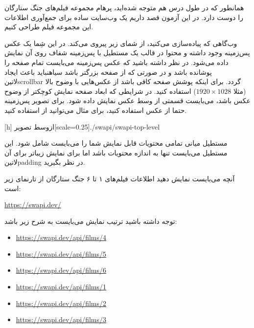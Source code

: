 
همانطور که در طول درس هم متوجه شده‌اید، پرهام مجموعه فیلم‌های جنگ ستارگان را دوست دارد.
در این آزمون قصد داریم یک وب‌سایت ساده برای جمع‌آوری اطلاعات این مجموعه فیلم طراحی کنیم.

وب‌گاهی که پیاده‌سازی می‌کنید، از شمای زیر پیروی می‌کند. در این شِما یک عکس پس‌زمینه وجود داشته و محتوا در قالب یک مستطیل با پس‌زمینه شفاف روی آن نمایش داده می‌شود.
در نظر داشته باشید که عکس پس‌زمینه می‌بایست تمام صفحه را پوشانده باشد و در صورتی که از صفحه بزرگتر باشد ‌سیاه{نباید} باعث ایجاد ‌لاتین{scrollbar} گردد.
برای اینکه پوشش صفحه کافی باشد از عکس‌هایی با وضوح بالا (مثلا $1920 \times 1028$) استفاده کنید.
در شرایطی که ابعاد صفحه نمایش کوچکتر از وضوح عکس باشد، می‌بایست قسمتی از وسط عکس نمایش داده شود.
برای تصویر پس‌زمینه حتما از عکس استفاده کنید، برای مثال می‌توانید از  استفاده کنید.

[h]
  ‌ازوسط
  ‌تصویر[scale=0.25]{./swapi/swapi-top-level}

مستطیل میانی تمامی محتویات قابل نمایش شما را می‌بایست شامل شود. این مستطیل می‌بایست تنها به اندازه محتویات باشد اما
برای نمایش زیباتر برای آن ‌لاتین{padding} در نظر بگیرید.


آنچه می‌بایست نمایش دهید اطلاعات فیلم‌های ۱ تا ۶ جنگ ستارگان از تارنمای زیر است:

\begin{latin}
  \url{https://swapi.dev/}
\end{latin}

توجه داشته باشید ترتیب نمایش می‌بایست به شرح زیر باشد:

\begin{latin}\begin{itemize}
  \item \url{https://swapi.dev/api/films/4}
  \item \url{https://swapi.dev/api/films/5}
  \item \url{https://swapi.dev/api/films/6}
  \item \url{https://swapi.dev/api/films/1}
  \item \url{https://swapi.dev/api/films/2}
  \item \url{https://swapi.dev/api/films/3}
\end{itemize}\end{latin}

